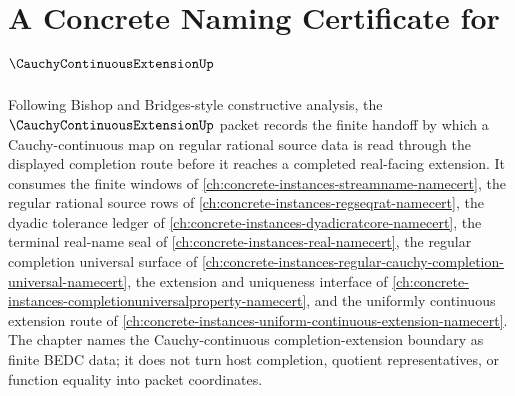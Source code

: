 \chapter{A Concrete Naming Certificate for $\CauchyContinuousExtensionUp$}
\label{ch:concrete-instances-cauchy-continuous-extension-namecert}

Following Bishop and Bridges-style constructive analysis, the $\CauchyContinuousExtensionUp$ packet records the finite handoff by which a Cauchy-continuous map on regular rational source data is read through the displayed completion route before it reaches a completed real-facing extension. It consumes the finite windows of \autoref{ch:concrete-instances-streamname-namecert}, the regular rational source rows of \autoref{ch:concrete-instances-regseqrat-namecert}, the dyadic tolerance ledger of \autoref{ch:concrete-instances-dyadicratcore-namecert}, the terminal real-name seal of \autoref{ch:concrete-instances-real-namecert}, the regular completion universal surface of \autoref{ch:concrete-instances-regular-cauchy-completion-universal-namecert}, the extension and uniqueness interface of \autoref{ch:concrete-instances-completionuniversalproperty-namecert}, and the uniformly continuous extension route of \autoref{ch:concrete-instances-uniform-continuous-extension-namecert}. The chapter names the Cauchy-continuous completion-extension boundary as finite BEDC data; it does not turn host completion, quotient representatives, or function equality into packet coordinates.

